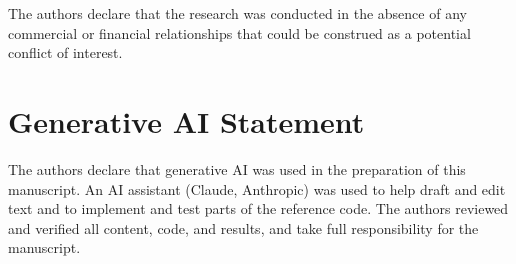 \documentclass[utf8]{FrontiersinHarvard}
\begin{document}
	The authors declare that the research was conducted in the absence of any commercial or financial relationships that could be construed as a potential conflict of interest.

	\section*{Generative AI Statement}

	The authors declare that generative AI was used in the preparation of this manuscript. An AI assistant (Claude, Anthropic) was used to help draft and edit text and to implement and test parts of the reference code. The authors reviewed and verified all content, code, and results, and take full responsibility for the manuscript.

	
	
\end{document}
